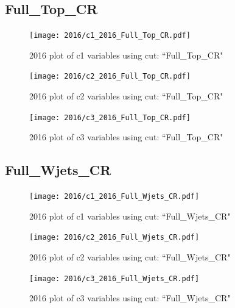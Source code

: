 \documentclass{article}
\begin{document}
      \subsection*{Full\_Top\_CR}
                        \begin{figure}[H]
                            \centering
                            \caption{2016 plot of c1 variables using cut: ``Full\_Top\_CR"}
                            \texttt{[image: 2016/c1\_2016\_Full\_Top\_CR.pdf]}
                        \end{figure}    
                        \begin{figure}[H]
                            \centering
                            \caption{2016 plot of c2 variables using cut: ``Full\_Top\_CR"}
                            \texttt{[image: 2016/c2\_2016\_Full\_Top\_CR.pdf]}
                        \end{figure}    
                        \begin{figure}[H]
                            \centering
                            \caption{2016 plot of c3 variables using cut: ``Full\_Top\_CR"}
                            \texttt{[image: 2016/c3\_2016\_Full\_Top\_CR.pdf]}
                        \end{figure}    
      \subsection*{Full\_Wjets\_CR}
                        \begin{figure}[H]
                            \centering
                            \caption{2016 plot of c1 variables using cut: ``Full\_Wjets\_CR"}
                            \texttt{[image: 2016/c1\_2016\_Full\_Wjets\_CR.pdf]}
                        \end{figure}    
                        \begin{figure}[H]
                            \centering
                            \caption{2016 plot of c2 variables using cut: ``Full\_Wjets\_CR"}
                            \texttt{[image: 2016/c2\_2016\_Full\_Wjets\_CR.pdf]}
                        \end{figure}    
                        \begin{figure}[H]
                            \centering
                            \caption{2016 plot of c3 variables using cut: ``Full\_Wjets\_CR"}
                            \texttt{[image: 2016/c3\_2016\_Full\_Wjets\_CR.pdf]}
                        \end{figure}    
\end{document}
